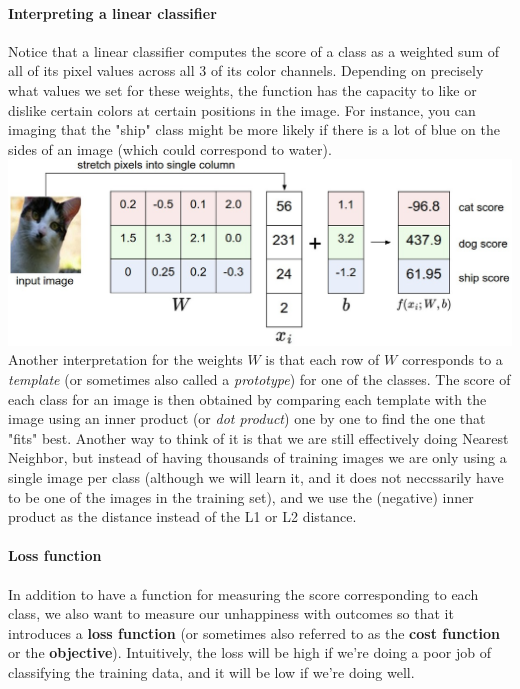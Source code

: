 \documentclass{article}
\begin{document}
\paragraph{Interpreting a linear classifier}
Notice that a linear classifier computes the score of a class as a weighted sum of all of its pixel values across all 3 of its color channels. Depending on precisely what values we set for these weights, the function has the capacity to like or dislike certain colors at certain positions in the image. For instance, you can imaging that the "ship" class might be more likely if there is a lot of blue on the sides of an image (which could correspond to water). \\
\includegraphics[scale=0.3]{images/imagemap.jpg} \\
Another interpretation for the weights $W$ is that each row of $W$ corresponds to a \textit{template} (or sometimes also called a \textit{prototype}) for one of the classes. The score of each class for an image is then obtained by comparing each template with the image using an inner product (or \textit{dot product}) one by one to find the one that "fits" best. Another way to think of it is that we are still effectively doing Nearest Neighbor, but instead of having thousands of training images we are only using a single image per class (although we will learn it, and it does not neccssarily have to be one of the images in the training set), and we use the (negative) inner product as the distance instead of the L1 or L2 distance.

\paragraph{Loss function}
In addition to have a function for measuring the score corresponding to each class, we also want to measure our unhappiness with outcomes so that it introduces a \textbf{loss function} (or sometimes also referred to as the \textbf{cost function} or the \textbf{objective}). Intuitively, the loss will be high if we're doing a poor job of classifying the training data, and it will be low if we're doing well.
\end{document}

